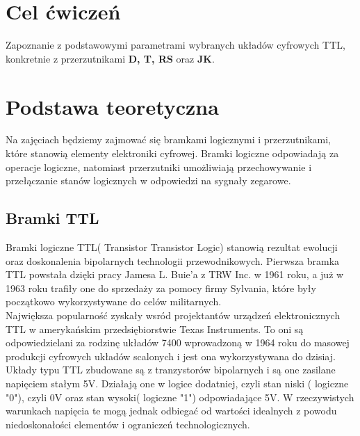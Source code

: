 \documentclass{article}
\begin{document}
\section{Cel ćwiczeń}

Zapoznanie z podstawowymi parametrami wybranych układów cyfrowych TTL, konkretnie z przerzutnikami \textbf{ D, T, RS} oraz \textbf{JK}.

\section{Podstawa teoretyczna}
    Na zajęciach będziemy zajmować się bramkami logicznymi i przerzutnikami, które stanowią elementy elektroniki cyfrowej. Bramki logiczne odpowiadają za operacje logiczne, natomiast przerzutniki umożliwiają przechowywanie i przełączanie stanów logicznych w odpowiedzi na sygnały zegarowe.

    \subsection{Bramki TTL}
    Bramki logiczne TTL( Transistor Transistor Logic) stanowią rezultat ewolucji oraz doskonalenia bipolarnych technologii przewodnikowych. 
    Pierwsza bramka TTL powstała dzięki pracy Jamesa L. Buie'a z TRW Inc. w 1961 roku, a już w 1963 roku trafiły one do sprzedaży za pomocy firmy Sylvania, które były początkowo wykorzystywane do celów militarnych\cite{maciak,wiki}.\\
   
    Największa popularność zyskały wsród projektantów urządzeń elektronicznych TTL w amerykańskim przedsiębiorstwie Texas Instruments. To oni są odpowiedzielani za rodzinę układów 7400 wprowadzoną w 1964 roku do masowej produkcji cyfrowych układów scalonych i jest ona wykorzystywana do dzisiaj\cite{maciak,wiki,TI7400}. \\
    
    Układy typu TTL zbudowane są z tranzystorów bipolarnych i są one zasilane napięciem stałym 5V. Działają one w logice dodatniej, czyli stan niski ( logiczne "0"), czyli 0V oraz stan wysoki( logiczne "1") odpowiadające 5V. W rzeczywistych warunkach napięcia te mogą jednak odbiegać od wartości idealnych z powodu niedoskonałości elementów i ograniczeń technologicznych\cite{maciak,wiki,TI7400}.
    \pagebreak
    
\end{document}
